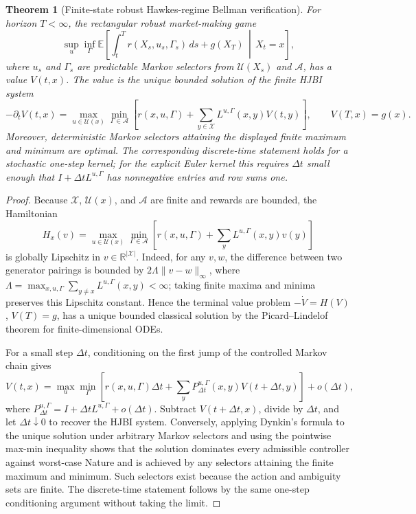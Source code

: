 \documentclass[11pt]{article}
\newtheorem{theorem}[assumption]{Theorem}
\newcommand{\R}{\mathbb{R}}
\newcommand{\E}{\mathbb{E}}
\begin{document}
\begin{theorem}[Finite-state robust Hawkes-regime Bellman verification]
For horizon $T<\infty$, the rectangular robust market-making game
\[
\sup_{u}\inf_{\Gamma}\E\left[
\int_t^T r(X_s,u_s,\Gamma_s)\,ds+g(X_T)
\,\middle|\,X_t=x\right],
\]
where $u_s$ and $\Gamma_s$ are predictable Markov selectors from
$\mathcal U(X_s)$ and $\mathcal A$, has a value $V(t,x)$. The value is the
unique bounded solution of the finite HJBI system
\[
-\partial_t V(t,x)
=\max_{u\in\mathcal U(x)}\min_{\Gamma\in\mathcal A}
\left[
r(x,u,\Gamma)+
\sum_{y\in\mathcal X}L^{u,\Gamma}(x,y)V(t,y)
\right],
\qquad
V(T,x)=g(x).
\]
Moreover, deterministic Markov selectors attaining the displayed finite
maximum and minimum are optimal. The corresponding discrete-time statement
holds for a stochastic one-step kernel; for the explicit Euler kernel this
requires $\Delta t$ small enough that $I+\Delta t L^{u,\Gamma}$ has nonnegative
entries and row sums one.
\end{theorem}

\begin{proof}
Because $\mathcal X$, $\mathcal U(x)$, and $\mathcal A$ are finite and rewards
are bounded, the Hamiltonian
\[
H_x(v)=\max_{u\in\mathcal U(x)}\min_{\Gamma\in\mathcal A}
\left[r(x,u,\Gamma)+\sum_y L^{u,\Gamma}(x,y)v(y)\right]
\]
is globally Lipschitz in $v\in\R^{|\mathcal X|}$. Indeed, for any $v,w$,
the difference between two generator pairings is bounded by
$2\Lambda\|v-w\|_\infty$, where
$\Lambda=\max_{x,u,\Gamma}\sum_{y\ne x}L^{u,\Gamma}(x,y)<\infty$; taking
finite maxima and minima preserves this Lipschitz constant. Hence the terminal
value problem $-\dot V=H(V)$, $V(T)=g$, has a unique bounded classical solution
by the Picard--Lindelof theorem for finite-dimensional ODEs.

For a small step $\Delta t$, conditioning on the first jump of the controlled
Markov chain gives
\[
V(t,x)=
\max_u\min_\Gamma
\left[
r(x,u,\Gamma)\Delta t+
\sum_y P_{\Delta t}^{u,\Gamma}(x,y)V(t+\Delta t,y)
\right]+o(\Delta t),
\]
where $P_{\Delta t}^{u,\Gamma}=I+\Delta t L^{u,\Gamma}+o(\Delta t)$. Subtract
$V(t+\Delta t,x)$, divide by $\Delta t$, and let $\Delta t\downarrow0$ to
recover the HJBI system. Conversely, applying Dynkin's formula to the unique
solution under arbitrary Markov selectors and using the pointwise
max-min inequality shows that the solution dominates every admissible
controller against worst-case Nature and is achieved by any selectors attaining
the finite maximum and minimum. Such selectors exist because the action and
ambiguity sets are finite. The discrete-time statement follows by the same
one-step conditioning argument without taking the limit.
\end{proof}
\end{document}
